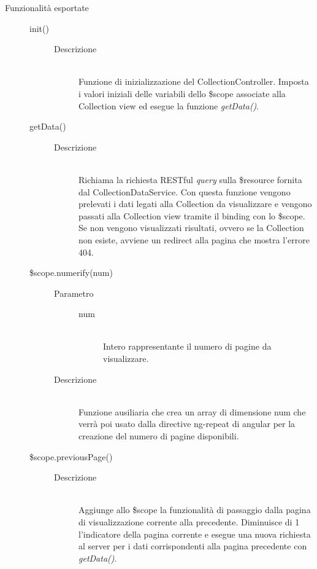 \begin{description}
 \item[Funzionalità esportate] \hfill
 \begin{description}
  \item[init()] \hfill
  	\begin{description}
  		\item[Descrizione] \hfill \\
  Funzione di inizializzazione del CollectionController. Imposta i valori iniziali delle variabili dello
  \$scope associate alla Collection view ed esegue la funzione \emph{getData()}.
  	\end{description}
  	
  \item[getData()] \hfill 
  \begin{description}
  		\item[Descrizione] \hfill \\
  Richiama la richiesta RESTful \textit{query} sulla \$resource fornita dal CollectionDataService.
  Con questa funzione vengono prelevati i dati legati alla Collection da visualizzare e vengono
  passati alla Collection view tramite il binding con lo \$scope. \\
  Se non vengono visualizzati risultati, ovvero se la Collection non esiste, avviene un redirect alla pagina
  che mostra l'errore 404.
  \end{description}
  
  \item[\$scope.numerify(num)] \hfill 
  \begin{description}
  	\item[Parametro] \hfill
  	\begin{description}
  		\item[num] \hfill \\
  		Intero rappresentante il numero di pagine da visualizzare.
	\end{description}  		
  	\item[Descrizione] \hfill \\
  Funzione ausiliaria che crea un array di dimensione   {num} che verrà poi usato dalla directive   {ng-repeat} di angular per la creazione 
  del numero di   pagine disponibili.
  \end{description}
  
  \item[\$scope.previousPage()] \hfill 
  \begin{description}
  		\item[Descrizione] \hfill \\
  Aggiunge allo \$scope la funzionalità di passaggio dalla pagina di visualizzazione corrente alla precedente. Diminuisce di 1 l'indicatore della pagina corrente e esegue una nuova richiesta al server per i dati corrispondenti alla pagina precedente con \emph{getData()}.
  \end{description}
  

\end{description}
\end{description}
